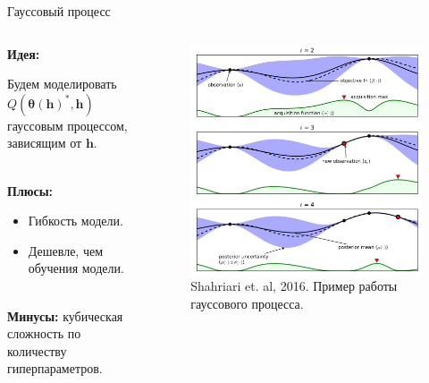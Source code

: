 \documentclass[10pt,pdf,utf8,russian,aspectratio=169]{beamer}
\begin{document}
\begin{frame}{Гауссовый процесс}

\begin{columns}
\begin{column}{0.5\textwidth}
\textbf{Идея:}

Будем моделировать $Q(\boldsymbol{\theta}(\mathbf{h})^{*}, \mathbf{h})$ гауссовым процессом, зависящим от $\mathbf{h}$.

~\\
\textbf{Плюсы:}
\begin{itemize}
\item Гибкость модели.
\item Дешевле, чем обучения модели.
\end{itemize}

~\\
\textbf{Минусы:} кубическая сложность по количеству гиперпараметров.

\end{column}
\begin{column}{0.4\textwidth}
\begin{figure}[h]
\includegraphics[width=\textwidth]{./gp.png}
\caption*{Shahriari et. al, 2016. Пример работы гауссового процесса.}
\end{figure}

\end{column}
\end{columns}
\end{frame}
\end{document}
